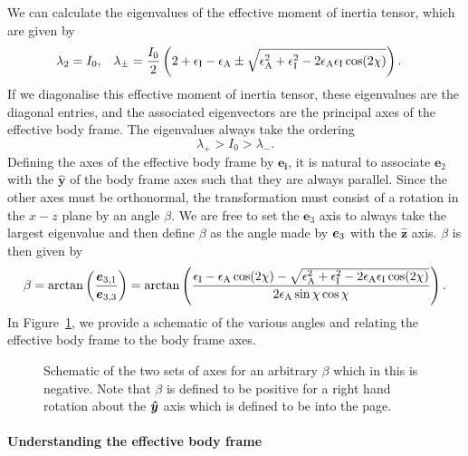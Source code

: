 \documentclass[../full_thesis/full_thesis.tex]{subfiles}
\newcommand{\thisdir}{../rotating_frame}
\begin{document}
We can calculate the eigenvalues of the effective moment of inertia tensor,
which are given by
\begin{align}
\lambda_{2}=I_{0}, &&&
\lambda_{\pm}=\frac{I_{0}}{2}
\left(2+\epsilon_{\mathrm{I}}-\epsilon_{\mathrm{A}}\pm
\sqrt{\epsilon_{\mathrm{A}}^{2}+\epsilon_{\mathrm{I}}^{2}-2\epsilon_{\mathrm{A}}\epsilon_{\mathrm{I}}\cos(2\chi)}\right).
\label{eqn: effective MOI comps}
\end{align}
If we diagonalise this effective moment of inertia tensor, these eigenvalues
are the diagonal entries, and the associated eigenvectors are the principal
axes of the effective body frame. The eigenvalues always take the ordering
\begin{equation}
\lambda_{+}>I_{0}>\lambda_{-}.
\end{equation}
Defining the axes of the effective body frame by $\boldsymbol{e_{i}}$, it is natural to
associate $\boldsymbol{e}_{2}$ with the
$\boldsymbol{\hat{y}}$ of the body frame axes such that they are always
parallel. Since the other axes must be orthonormal, the transformation must
consist of a rotation in the $x-z$ plane by an angle $\beta$. We are
free to set the $\boldsymbol{e}_{3}$ axis to always take the largest eigenvalue
and then define $\beta$ as the angle made by $\boldsymbol{e}_{3}$ with the
$\hat{\boldsymbol{z}}$ axis. $\beta$ is then given by
\begin{equation}
\beta = \arctan\left(\frac{\boldsymbol{e}_{3,1}}{\boldsymbol{e}_{3,3}}\right)
=\arctan\left( \frac{ \epsilon_{\mathrm{I}}-\epsilon_{\mathrm{A}}\cos(2\chi)-
              \sqrt{\epsilon_{\mathrm{A}}^{2}+\epsilon_{\mathrm{I}}^{2}-2\epsilon_{\mathrm{A}}\epsilon_{\mathrm{I}}\cos(2\chi)}}
              {2\epsilon_{\mathrm{A}}\sin\chi \cos\chi}\right).
\label{eqn: beta}
\end{equation}
In Figure~\ref{fig: schematic}, we provide a schematic of the various angles
and relating the effective body frame to the body frame axes.
\begin{figure}[ht]
\centering
 
\caption{Schematic of the two sets of axes for an arbitrary $\beta$ which in this
is negative. Note that
$\beta$ is defined to be positive for a right hand rotation about the $\boldsymbol{\hat{y}}$ axis
which is defined to be into the page.}
\label{fig: schematic}
\end{figure}

\paragraph{Understanding the effective body frame}
\end{document}

